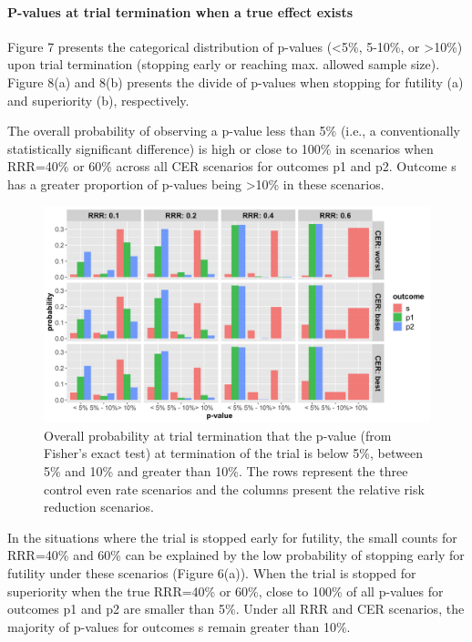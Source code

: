 \documentclass[]{article}
\let\oldparagraph\paragraph
\renewcommand{\paragraph}[1]{\oldparagraph{#1}\mbox{}}
\begin{document}
\clearpage

\hypertarget{p-values-at-trial-termination-when-a-true-effect-exists}{%
\paragraph{P-values at trial termination when a true effect
exists}\label{p-values-at-trial-termination-when-a-true-effect-exists}}

Figure 7 presents the categorical distribution of p-values
(\textless{}5\%, 5-10\%, or \textgreater{}10\%) upon trial termination
(stopping early or reaching max. allowed sample size). Figure 8(a) and
8(b) presents the divide of p-values when stopping for futility (a) and
superiority (b), respectively.

The overall probability of observing a p-value less than 5\% (i.e., a
conventionally statistically significant difference) is high or close to
100\% in scenarios when RRR=40\% or 60\% across all CER scenarios for
outcomes p1 and p2. Outcome s has a greater proportion of p-values being
\textgreater{}10\% in these scenarios.

\begin{figure}
  \caption{Overall probability at trial termination that the p-value (from Fisher’s exact test) at termination of the
  trial is below 5\%, between 5\% and 10\% and greater than 10\%. The rows represent the three control even rate scenarios
  and the columns present the relative risk reduction scenarios.}
  \includegraphics{../p1_plots/batch_size_nb_1000/pvalue_p1.png}
\end{figure}

In the situations where the trial is stopped early for futility, the
small counts for RRR=40\% and 60\% can be explained by the low
probability of stopping early for futility under these scenarios (Figure
6(a)). When the trial is stopped for superiority when the true RRR=40\%
or 60\%, close to 100\% of all p-values for outcomes p1 and p2 are
smaller than 5\%. Under all RRR and CER scenarios, the majority of
p-values for outcomes s remain greater than 10\%.
\end{document}
